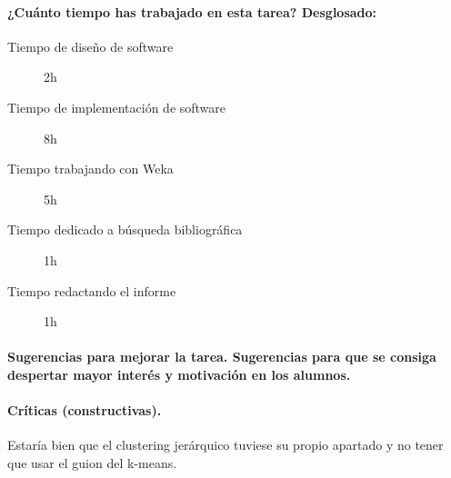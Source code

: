 \documentclass[11pt, titlepage,a4paper]{article}
\begin{document}
\paragraph{¿Cuánto tiempo has trabajado en esta tarea? Desglosado:\\}
\begin{description}
	\item[Tiempo de diseño de software] 2h
	\item[Tiempo de implementación de software] 8h
	\item[Tiempo trabajando con Weka] 5h
	\item[Tiempo dedicado a búsqueda bibliográfica] 1h
	\item[Tiempo redactando el informe] 1h
\end{description}

\paragraph{Sugerencias para mejorar la tarea. Sugerencias para que se consiga despertar mayor
interés y motivación en los alumnos.\\}

\paragraph{Críticas (constructivas).\\}
Estaría bien que el clustering jerárquico tuviese su propio apartado y no tener
que usar el guion del k-means.
\end{document}

